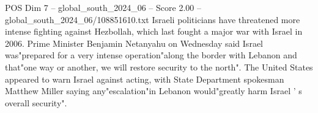 \begin{textsample}{POS Dim 7 – global\_south\_2024\_06 – Score 2.00 – global\_south\_2024\_06/108851610.txt}
Israeli politicians have threatened more intense fighting against Hezbollah, which last fought a major war with Israel in 2006.
Prime Minister Benjamin Netanyahu on Wednesday said Israel was"prepared for a very intense operation"along the border with Lebanon and that"one way or another, we will restore security to the north".
The United States appeared to warn Israel against acting, with State Department spokesman Matthew Miller saying any"escalation"in Lebanon would"greatly harm Israel ' s overall security".

\end{textsample}
